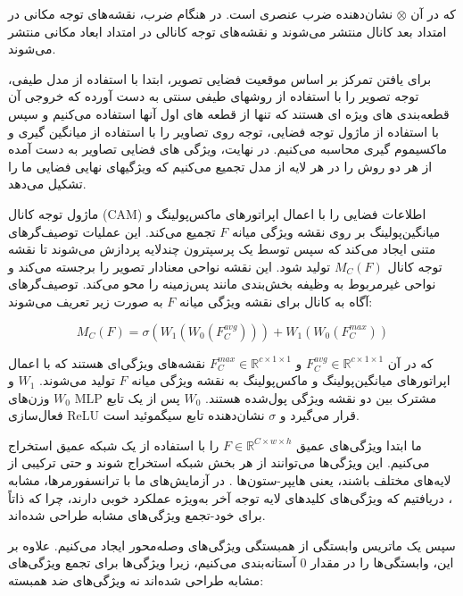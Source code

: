 که در آن $\otimes$ نشان‌دهنده ضرب عنصری است. در هنگام ضرب، نقشه‌های توجه مکانی در امتداد بعد کانال منتشر می‌شوند و نقشه‌های توجه کانالی در امتداد ابعاد مکانی منتشر می‌شوند.

برای یافتن تمرکز بر اساس موقعیت فضایی تصویر، ابتدا با استفاده از مدل طیفی، توجه تصویر را با استفاده از روشهای طیفی سنتی به دست آورده که خروجی آن قطعه‌بندی های ویژه ای هستند که تنها از قطعه های اول آنها استفاده می‌کنیم و سپس با استفاده از ماژول توجه فضایی، توجه روی تصاویر را با استفاده از میانگین گیری و ماکسیموم گیری محاسبه می‌کنیم. در نهایت، ویژگی های فضایی تصاویر به دست آمده از هر دو روش را در هر لایه از مدل تجمیع می‌کنیم که ویژگیهای نهایی فضایی ما را تشکیل می‌دهد.



ماژول توجه کانال (CAM) اطلاعات فضایی را با اعمال اپراتورهای ماکس‌پولینگ و میانگین‌پولینگ بر روی نقشه ویژگی میانه \( F \) تجمیع می‌کند. این عملیات توصیف‌گرهای متنی ایجاد می‌کند که سپس توسط یک پرسپترون چندلایه پردازش می‌شوند تا نقشه توجه کانال \( M_C(F) \) تولید شود. این نقشه نواحی معنادار تصویر را برجسته می‌کند و نواحی غیرمربوط به وظیفه بخش‌بندی مانند پس‌زمینه را محو می‌کند. توصیف‌گرهای آگاه به کانال برای نقشه ویژگی میانه \( F \) به صورت زیر تعریف می‌شوند:

\begin{equation}
M_C(F) = \sigma(W_1(W_0(F_C^{avg}))) + W_1(W_0(F_C^{max}))
\end{equation}

که در آن \( F_C^{avg} \in \mathbb{R}^{c \times 1 \times 1} \) و \( F_C^{max} \in \mathbb{R}^{c \times 1 \times 1} \) نقشه‌های ویژگی‌ای هستند که با اعمال اپراتورهای میانگین‌پولینگ و ماکس‌پولینگ به نقشه ویژگی میانه \( F \) تولید می‌شوند. \( W_1 \) و \( W_0 \) وزن‌های MLP مشترک بین دو نقشه ویژگی پول‌شده هستند. \( W_0 \) پس از یک تابع فعال‌سازی ReLU قرار می‌گیرد و \( \sigma \) نشان‌دهنده تابع سیگموئید است.



ما ابتدا ویژگی‌های عمیق \(F \in \mathbb{R}^{C \times w \times h}\) را با استفاده از یک شبکه عمیق استخراج می‌کنیم. این ویژگی‌ها می‌توانند از هر بخش شبکه استخراج شوند و حتی ترکیبی از لایه‌های مختلف باشند، یعنی هایپر-ستون‌ها \cite{hariharan2015hypercolumnsobjectsegmentationfinegrained}. در آزمایش‌های ما با ترانسفورمرها، مشابه \cite{vo2019unsupervisedimagematchingobject}، دریافتیم که ویژگی‌های کلیدهای لایه توجه آخر به‌ویژه عملکرد خوبی دارند، چرا که ذاتاً برای خود-تجمع ویژگی‌های مشابه طراحی شده‌اند.

سپس یک ماتریس وابستگی از همبستگی ویژگی‌های وصله‌محور ایجاد می‌کنیم. علاوه بر این، وابستگی‌ها را در مقدار \(0\) آستانه‌بندی می‌کنیم، زیرا ویژگی‌ها برای تجمع ویژگی‌های مشابه طراحی شده‌اند نه ویژگی‌های ضد همبسته:

